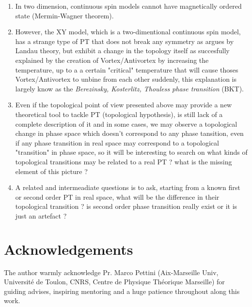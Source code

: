 \documentclass[a4paper,11pt]{article}
\begin{document}
\begin{enumerate}
\item In two dimension, continuous spin models cannot have magnetically ordered state (Mermin-Wagner theorem).

\item However, the XY model, which is a two-dimentional continuous spin model, has a strange type of PT that does not break any symmetry as argues by Landau theory, but exhibit a change in the topology itself as succesfully explained by the creation of Vortex/Antivortex by increasing the temperature, up to a a certain "critical" temperature that will cause thoses Vortex/Antivortex to unbine from each other suddenly, this explanation is largely know as the \textit{Berezinsky, Kosterlitz, Thouless phase transition} (BKT).

\item Even if the topological point of view presented above may provide a new theoretical tool to tackle PT (topological hypothesis), is still lack of a complete description of it and in some cases, we may observe a topological change in phase space which doesn't correspond to any phase tansition, even if any phase transition in real space may correspond to a topological "transition" in phase space, so it will be interesting to search on what kinds of topological transitions may be related to a real PT ? what is the missing element of this picture ? 
 
\item A related and intermeadiate questions is to ask, starting from a known first or second order PT in real space, what will be the difference in their topological transition ? is second order phase transition really exist or it is just an artefact ?

\end{enumerate}

\section*{Acknowledgements}

The author warmly acknowledge Pr. Marco Pettini (Aix-Marseille Univ, Université de Toulon, CNRS, Centre de Physique Théorique Marseille) for guiding advises, inspiring mentoring and a huge patience throughout along this work.




\printbibliography %
\end{document}

